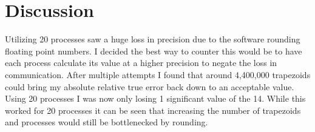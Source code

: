 \documentclass[table]{report}
\begin{document}
\section{Discussion}

Utilizing 20 processes saw a huge loss in precision due to the software
rounding floating point numbers. I decided the best way to counter this
would be to have each process calculate its value at a higher precision
to negate the loss in communication. After multiple attempts I found
that around 4,400,000 trapezoids could bring my absolute relative true
error back down to an acceptable value. Using 20 processes I was now
only losing 1 significant value of the 14. While this worked for 20
processes it can be seen that increasing the number of trapezoids and
processes would still be bottlenecked by rounding.
\end{document}
